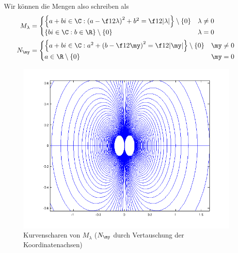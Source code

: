 \documentclass{mywork}
\begin{document}
\begin{aufgabe}
		Wir können die Mengen also schreiben als
		\begin{align*}
			M_\lambda &= \begin{cases}
				\left\{a+bi\in \C : \left(a-\f 1{2\lambda}\right)^2+b^2=\f1{2|\lambda|}\right\} \setminus \{0\} & \lambda\neq 0\\
												\{bi\in \C : b\in \R\} \setminus \{0\} & \lambda=0
			\end{cases}\\
			N_\my &= \begin{cases}
				\left\{a+bi\in \C : a^2+\left(b-\f 1{2\my}\right)^2=\f1{2|\my|}\right\} \setminus \{0\} & \my\neq 0\\
												 a\in \R \setminus \{0\} & \my=0
			\end{cases}
		\end{align*}
		\begin{figure}[h]
			\centering
			\caption{Kurvenscharen von $M_\lambda$ ($N_\my$ durch Vertauschung der Koordinatenachsen)}
			\includegraphics[scale=0.6]{ana3_1_1}
		\end{figure}
	\end{aufgabe}
\end{document}
